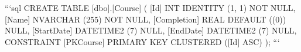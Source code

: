 \markdownRendererDocumentBegin
```sql CREATE TABLE [dbo].[Course] ( [Id] INT IDENTITY (1, 1) NOT NULL, [Name] NVARCHAR (255) NOT NULL, [Completion] REAL DEFAULT ((0)) NULL, [StartDate] DATETIME2 (7) NULL, [EndDate] DATETIME2 (7) NULL, CONSTRAINT [PK\markdownRendererUnderscore{}Course] PRIMARY KEY CLUSTERED ([Id] ASC) ); \markdownRendererInterblockSeparator
{}\markdownRendererInterblockSeparator
{}```\markdownRendererDocumentEnd